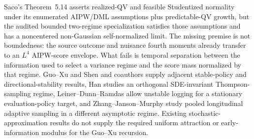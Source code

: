 Saco's Theorem~5.14 asserts realized-QV and feasible Studentized normality under its enumerated AIPW/DML assumptions plus predictable-QV growth, but the audited bounded two-regime specialization satisfies those assumptions and has a noncentered non-Gaussian self-normalized limit.  The missing premise is not boundedness: the source outcome and nuisance fourth moments already transfer to an \(L^4\) AIPW-score envelope.  What fails is temporal separation between the information used to select a variance regime and the score mass normalized by that regime.  Guo--Xu and Shen and coauthors supply adjacent stable-policy and directional-stability results, Han studies an orthogonal SDE-invariant Thompson-sampling regime, Leiner--Dunn--Ramdas allow unstable logging for a stationary evaluation-policy target, and Zhang--Janson--Murphy study pooled longitudinal adaptive sampling in a different asymptotic regime.  Existing stochastic-approximation results do not supply the required uniform attraction or early-information modulus for the Guo--Xu recursion.